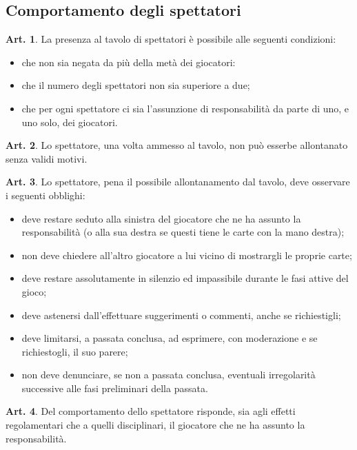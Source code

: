 \documentclass[italian,a4paper]{article}
\theoremstyle{definition}
\newtheorem{art}{Art.}
\newenvironment{packeditem}{
\begin{itemize}
  \setlength{\itemsep}{1pt}
  \setlength{\parskip}{0pt}
  \setlength{\parsep}{0pt}
}{\end{itemize}}
\begin{document}
\subsection{Comportamento degli spettatori}
\begin{art}
    La presenza al tavolo di spettatori è possibile alle seguenti condizioni:
    \begin{packeditem}
\item      che non sia negata da più della metà dei giocatori:
\item      che il numero degli spettatori non sia superiore a due;
\item      che per ogni spettatore ci sia l'assunzione di responsabilità da parte di uno, e uno solo, dei giocatori.
    \end{packeditem}
\end{art}
\begin{art}
    Lo spettatore, una volta ammesso al tavolo, non può esserbe allontanato senza validi motivi.
\end{art}
\begin{art}
    Lo spettatore, pena il possibile allontanamento dal tavolo, deve osservare i seguenti obblighi:
    \begin{packeditem}
\item      deve restare seduto alla sinistra del giocatore che ne ha assunto la responsabilità (o alla sua destra se questi tiene le carte con la mano destra);
\item      non deve chiedere all'altro giocatore a lui vicino di mostrargli le proprie carte;
\item      deve restare assolutamente in silenzio ed impassibile durante le fasi attive del gioco;
\item      deve astenersi dall'effettuare suggerimenti o commenti, anche se richiestigli;
\item      deve limitarsi, a passata conclusa, ad esprimere, con moderazione e se richiestogli, il suo parere;
\item        non deve denunciare, se non a passata conclusa, eventuali irregolarità successive alle fasi preliminari della passata.
    \end{packeditem}
\end{art}
\begin{art}
    Del comportamento dello spettatore risponde, sia agli effetti regolamentari che a quelli disciplinari, il giocatore che ne ha assunto la responsabilità.
\end{art}
\end{document}
